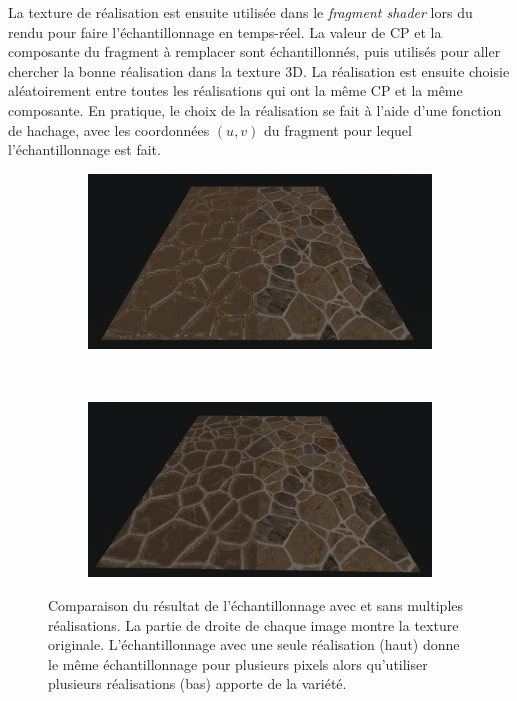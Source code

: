 La texture de réalisation est ensuite utilisée dans le \textit{fragment shader} lors du rendu pour faire l'échantillonnage en temps-réel. La valeur de CP et la composante du fragment à remplacer sont échantillonnés, puis utilisés pour aller chercher la bonne réalisation dans la texture 3D. La réalisation est ensuite choisie aléatoirement entre toutes les réalisations qui ont la même CP et la même composante. En pratique, le choix de la réalisation se fait à l'aide d'une fonction de hachage, avec les coordonnées $(u, v)$ du fragment pour lequel l'échantillonnage est fait.

\bigskip

\begin{figure}
    \centering
    \begin{subfigure}{.95\textwidth}
        \centering
        \includegraphics[width=\textwidth]{contenu/resources/images/partitioned_sampling_pc_preserving_no_shuffle}
    \end{subfigure}
    \\
    \begin{subfigure}{.95\textwidth}
        \centering
        \includegraphics[width=\textwidth]{contenu/resources/images/partitioned_sampling_pc_preserving_shuffle_uv}
    \end{subfigure}
    \caption[Échantillonnage avec et sans multiples réalisations]{Comparaison du résultat de l'échantillonnage avec et sans multiples réalisations. La partie de droite de chaque image montre la texture originale. L'échantillonnage avec une seule réalisation (haut) donne le même échantillonnage pour plusieurs pixels alors qu'utiliser plusieurs réalisations (bas) apporte de la variété.}
    \label{fig:offset-shuffle}
\end{figure}

